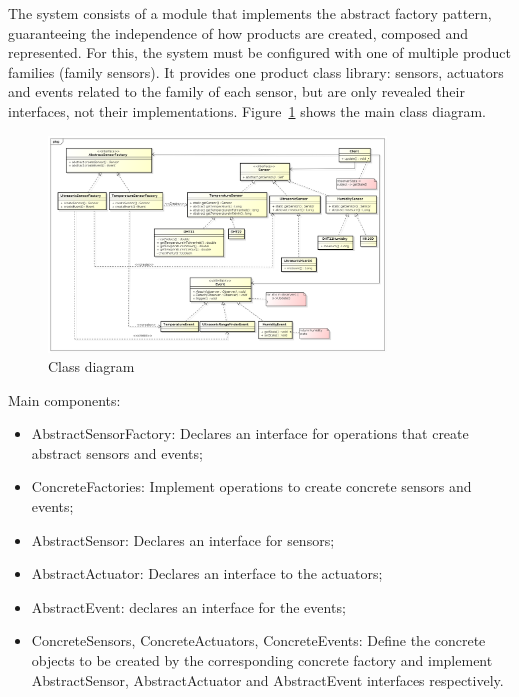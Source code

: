 \documentclass{acm_proc_article-sp}
\begin{document}
The system consists of a module that implements the abstract factory pattern, guaranteeing the independence of how products are created, composed and represented. For this, the system must be configured with one of multiple product families (family sensors). It provides one product class library: sensors, actuators and events related to the family of each sensor, but are only revealed their interfaces, not their implementations. Figure~\ref{fig:classDiagram} shows the main class diagram.
\begin{figure}[h]
    \includegraphics[width=0.8\textwidth,natwidth=610,natheight=642]{pictures/ClassDiagram.png}
    \caption{Class diagram}
    \label{fig:classDiagram}
\end{figure}

Main components:
\begin{itemize}
\item AbstractSensorFactory: Declares an interface for operations that create abstract sensors and events;
\item ConcreteFactories: Implement operations to create concrete sensors and events;
\item AbstractSensor: Declares an interface for sensors;
\item AbstractActuator: Declares an interface to the actuators;
\item AbstractEvent: declares an interface for the events;
\item ConcreteSensors, ConcreteActuators, ConcreteEvents: Define the concrete objects to be created by the corresponding concrete factory and implement AbstractSensor, AbstractActuator and AbstractEvent interfaces respectively.

\end{itemize}
\end{document}
